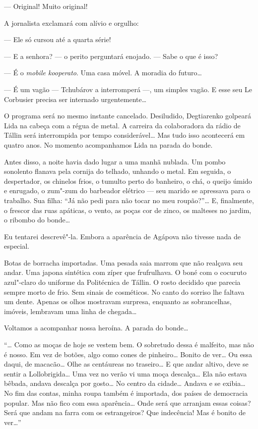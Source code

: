 --- Original! Muito original!

A jornalista exclamará com alívio e orgulho:

--- Ele só cursou até a quarta série!

--- E a senhora? --- o perito perguntará enojado. --- Sabe o que é isso?

--- É o \emph{mobile kooperato}. Uma casa móvel. A moradia do futuro\ldots{}

--- É um vagão --- Tchubárov a interromperá ---, um simples vagão. E
esse seu Le Corbusier precisa ser internado urgentemente\ldots{}

O programa será no mesmo instante cancelado. Desiludido, Degtiarenko
golpeará Lida na cabeça com a régua  de metal. A carreira da
colaboradora da rádio de Tállin será interrompida por tempo
considerável\ldots{} Mas tudo isso acontecerá em quatro anos. No momento
acompanhamos Lida na parada do bonde.

Antes disso, a noite havia dado lugar a uma manhã nublada. Um pombo
sonolento flanava pela cornija do telhado, unhando o metal. Em seguida,
o despertador, os chinelos frios, o tumulto perto do banheiro, o chá, o
queijo úmido e enrugado, o zum"-zum do barbeador elétrico --- seu marido
se apressava para o trabalho. Sua filha: ``Já não pedi para não tocar no
meu roupão?''\ldots{} E, finalmente, o frescor das ruas apáticas, o vento, as
poças cor de zinco, os malteses no jardim, o ribombo do bonde\ldots{}

Eu tentarei descrevê"-la. Embora a aparência de Agápova não tivesse nada
de especial.

Botas de borracha importadas. Uma pesada saia marrom que não realçava
seu andar. Uma japona sintética com zíper que frufrulhava. O boné com o
cocuruto azul"-claro do uniforme da Politécnica de Tállin. O rosto
decidido que parecia sempre morto de frio. Sem sinais de cosméticos. No
canto do sorriso lhe faltava um dente. Apenas os olhos mostravam
surpresa, enquanto as sobrancelhas, imóveis, lembravam uma linha de
chegada\ldots{}

Voltamos a acompanhar nossa heroína. A parada do bonde\ldots{}

``\ldots{} Como as moças de hoje se vestem bem. O sobretudo dessa é malfeito,
mas não é nosso. Em vez de botões, algo como cones de pinheiro\ldots{} Bonito
de ver\ldots{} Ou essa daqui, de macacão\ldots{} Olhe as centáureas no traseiro\ldots{}
E que andar altivo, deve se sentir a Lollobrigida\ldots{} Uma vez no verão vi
uma moça descalça\ldots{} Ela não estava bêbada, andava descalça por gosto\ldots{}
No centro da cidade\ldots{} Andava e se exibia\ldots{} No fim das contas, minha
roupa também é importada, dos países de democracia popular. Mas não fico
com essa aparência\ldots{} Onde será que arranjam essas coisas? Será que
andam na farra com os estrangeiros? Que indecência! Mas é bonito de
ver\ldots{}''

